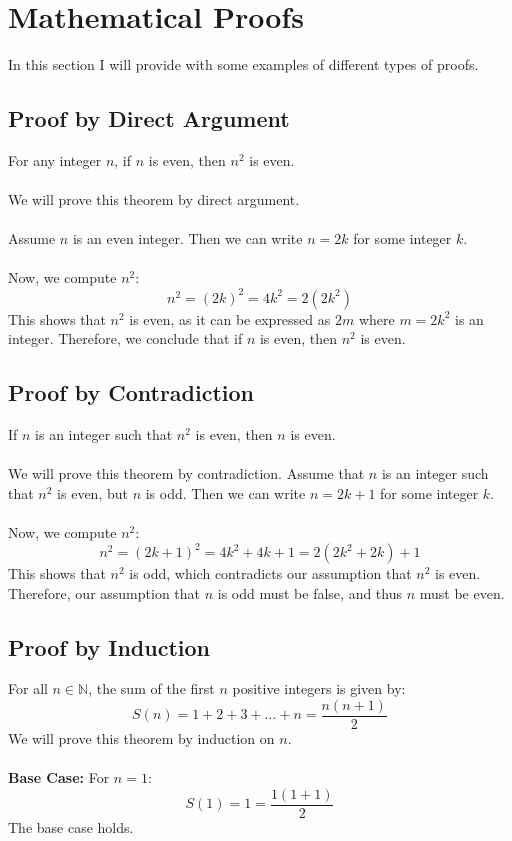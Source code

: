\newpage
\section{Mathematical Proofs}

In this section I will provide with some examples of different types of proofs.

\subsection{Proof by Direct Argument}

For any integer \( n \), if \( n \) is even, then \( n^2 \) is even.
\\\\
	We will prove this theorem by direct argument.
\\\\
	Assume \( n \) is an even integer. Then we can write \( n = 2k \) for some integer \( k \).
\\\\
	Now, we compute \( n^2 \):
	\[
		n^2 = (2k)^2 = 4k^2 = 2(2k^2)
	\]
	This shows that \( n^2 \) is even, as it can be expressed as \( 2m \) where \( m = 2k^2 \) is an integer.
	Therefore, we conclude that if \( n \) is even, then \( n^2 \) is even.
\QED

\subsection{Proof by Contradiction}

If \( n \) is an integer such that \( n^2 \) is even, then \( n \) is even.
\\\\
	We will prove this theorem by contradiction. Assume that \( n \) is an integer such that \( n^2 \) is even, but \( n \) is odd. Then we can write \( n = 2k + 1 \) for some integer \( k \).
\\\\
	Now, we compute \( n^2 \):
	\[
		n^2 = (2k + 1)^2 = 4k^2 + 4k + 1 = 2(2k^2 + 2k) + 1
	\]
	This shows that \( n^2 \) is odd, which contradicts our assumption that \( n^2 \) is even. Therefore, our assumption that \( n \) is odd must be false, and thus \( n \) must be even.
\QED

\subsection{Proof by Induction}

For all \( n \in \mathbb{N} \), the sum of the first \( n \) positive integers is given by:
\[
	S(n) = 1 + 2 + 3 + \ldots + n = \frac{n(n+1)}{2}
\]
We will prove this theorem by induction on \( n \).
\\\\
	\textbf{Base Case:} For \( n = 1 \):
	\[
		S(1) = 1 = \frac{1(1+1)}{2}
	\]
	The base case holds.

